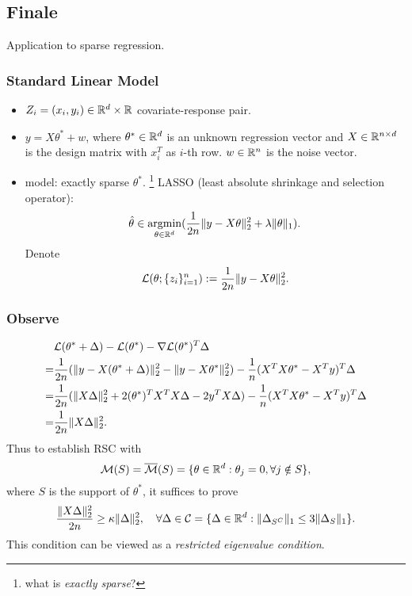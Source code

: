 \subsection{Finale}

Application to sparse regression.

\subsubsection{Standard Linear Model}

\begin{itemize}
    \item $Z_i=(x_i,y_i)\in{\mathbb{R}}^d\times{\mathbb{R}}$ covariate-response pair.
    \item $y=X\theta^*+w$,
        where $\theta^*\in{\mathbb{R}}^d$ is an unknown regression vector and
        $X\in{\mathbb{R}}^{n\times d}$ is the design matrix with $x_i^T$ as $i$-th row.
        $w\in{\mathbb{R}}^n$ is the noise vector.
    \item model: exactly sparse $\theta^*$.
        \footnote{what is \emph{exactly sparse}?}
        LASSO (least absolute shrinkage and selection operator):
        \begin{equation}
            {\hat{\theta}}\in\mathop{\mathrm{argmin}}_{\theta\in{\mathbb{R}}^d}(\frac{1}{2n}\|y-X\theta\|_2^2+\lambda\|\theta\|_1).
        \end{equation}
        Denote
        \begin{equation}
            \mathcal{L}(\theta;\{z_i\}_{i=1}^n) := \frac{1}{2n}\|y-X\theta\|_2^2.
        \end{equation}
\end{itemize}

\subsubsection{Observe}

\begin{equation}
\begin{split}
      & \mathcal{L}(\theta^*+\Delta)-\mathcal{L}(\theta^*)-\nabla\mathcal{L}(\theta^*)^T\Delta    \\
    = & \frac{1}{2n}(\|y-X(\theta^*+\Delta)\|_2^2-\|y-X\theta^*\|_2^2)
        - \frac{1}{n}(X^TX\theta^*-X^Ty)^T\Delta  \\
    = & \frac{1}{2n}(\|X\Delta\|_2^2+2(\theta^*)^TX^TX\Delta-2y^TX\Delta)
        - \frac{1}{n}(X^TX\theta^*-X^Ty)^T\Delta  \\
    = & \frac{1}{2n}\|X\Delta\|_2^2.
\end{split}
\end{equation}
Thus to establish RSC with
\begin{equation}
    \mathcal{M}(S) = {\overline{\mathcal{M}}}(S) = \{\theta\in{\mathbb{R}}^d:\theta_j=0, \forall j\notin S\},
\end{equation}
where $S$ is the support of $\theta^*$,
it suffices to prove
\begin{equation}
    \frac{\|X\Delta\|_2^2}{2n}\ge \kappa\|\Delta\|_2^2,\quad
        \forall \Delta\in\mathcal{C}=\{\Delta\in{\mathbb{R}}^d:\|\Delta_{S^C}\|_1\le3\|\Delta_S\|_1\}.
\end{equation}
This condition can be viewed as a \emph{restricted eigenvalue condition}.

